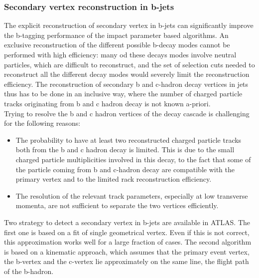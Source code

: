 \subsubsection{Secondary vertex reconstruction in b-jets}
The explicit reconstruction of secondary vertex in b-jets can significantly improve the b-tagging performance of the impact parameter based algorithms. An exclusive reconstruction of the different possible b-decay modes cannot be performed with high efficiency: many od these decays modes involve neutral particles, which are difficult to reconstruct, and the set of selection cuts needed to reconstruct all the different decay modes would severely limit the reconstruction efficiency. The reconstruction of secondary b and c-hadron decay vertices in jets thus has to be done in an inclusive way, where the number of charged particle tracks originating from b and c hadron decay is not known a-priori.\\
Trying to resolve the b and c hadron vertices of the decay cascade is challenging for the following reasons:
\begin{itemize}
\item The probability to have at least two reconstructed charged particle tracks both from the b and c hadron decay is limited. This is due to the small charged particle multiplicities involved in this decay,  to the fact that some of the particle coming from b and c-hadron decay are compatible with the primary vertex and to the limited rack reconstruction efficiency.
\item The resolution of the relevant track parameters, especially at low transverse momenta, are not sufficient to separate the two vertices efficiently.
\end{itemize}
Two strategy to detect a secondary vertex in b-jets are available in ATLAS. The first one is based on a fit of single geometrical vertex. Even if this is not correct, this approximation works well for a large fraction of cases. The second algorithm is based on a kinematic approach, which assumes that the primary event vertex, the b-vertex and the c-vertex lie approximately on the same line, the flight path of the b-hadron.

